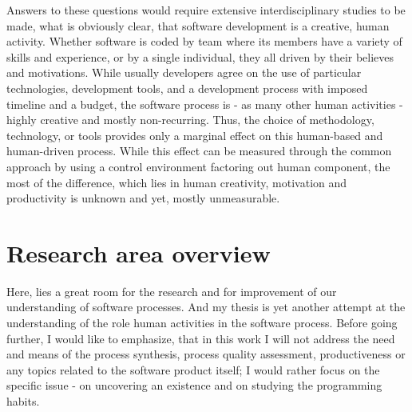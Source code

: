 Answers to these questions would require extensive interdisciplinary studies to be made, what is 
obviously clear, that software development is a creative, human activity. Whether software is coded 
by team where its members have a variety of skills and experience, or by a single individual,
they all driven by their believes and motivations. While usually developers agree on the use of 
particular technologies, development tools, and a development process with imposed timeline and 
a budget, the software process is - as many other human activities - highly creative and mostly 
non-recurring. Thus, the choice of methodology, technology, or tools provides only a marginal 
effect on this human-based and human-driven process. While this effect can be measured through 
the common approach by using a control environment factoring out human component, the most of 
the difference, which lies in human creativity, motivation and productivity is unknown and yet, 
mostly unmeasurable.

\section{Research area overview}
Here, lies a great room for the research and for improvement of our understanding of software 
processes. And my thesis is yet another attempt at the understanding of the role human activities 
in the software process. Before going further, I would like to emphasize, that in this work I will not 
address the need and means of the process synthesis, process quality assessment, productiveness
or any topics related to the software product itself; I would rather focus on the specific issue - 
on uncovering an existence and on studying the programming habits. 

